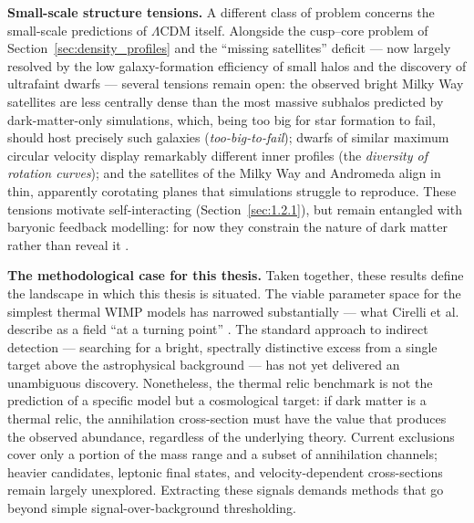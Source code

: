 \textbf{Small-scale structure tensions.}
A different class of problem concerns the small-scale predictions of $\Lambda$CDM itself.
Alongside the cusp--core problem of Section~\ref{sec:density_profiles} and the ``missing satellites'' deficit --- now largely resolved by the low galaxy-formation efficiency of small halos and the discovery of ultrafaint dwarfs --- several tensions remain open:
the observed bright Milky Way satellites are less centrally dense than the most massive subhalos predicted by dark-matter-only simulations, which, being too big for star formation to fail, should host precisely such galaxies (\textit{too-big-to-fail});
%
%
%
dwarfs of similar maximum circular velocity display remarkably different inner profiles (the \textit{diversity of rotation curves}); and the satellites of the Milky Way and Andromeda align in thin, apparently corotating planes that simulations struggle to reproduce.
These tensions motivate self-interacting (Section~\ref{sec:1.2.1}), but remain entangled with baryonic feedback modelling: for now they constrain the nature of dark matter rather than reveal it \cite{Bullock:2017xww, Tulin:2017ara}.

\textbf{The methodological case for this thesis.}
Taken together, these results define the landscape in which this thesis is situated.
The viable parameter space for the simplest thermal WIMP models has narrowed substantially --- what Cirelli et al.
describe as a field ``at a turning point'' \cite{Cirelli:2024ssz}.
The standard approach to indirect detection --- searching for a bright, spectrally distinctive excess from a single target above the astrophysical background --- has not yet delivered an unambiguous discovery.
Nonetheless, the thermal relic benchmark is not the prediction of a specific model but a cosmological target: if dark matter is a thermal relic, the annihilation cross-section must have the value that produces the observed abundance, regardless of the underlying theory.
Current exclusions cover only a portion of the mass range and a subset of annihilation channels; heavier candidates, leptonic final states, and velocity-dependent cross-sections remain largely unexplored.
Extracting these signals demands methods that go beyond simple signal-over-background thresholding.

